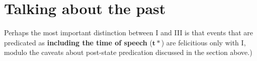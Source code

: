 %
%
%
%


\section{Talking about the past}\label{sec:djr-pst}



Perhaps the most important distinction between \gls{I} and \gls{III} is that events that are predicated as \textbf{including the time of speech} ($\boldsymbol{t*} $) are felicitious only with \gls{I}, modulo the caveats about post-state predication discussed in the section above.)


